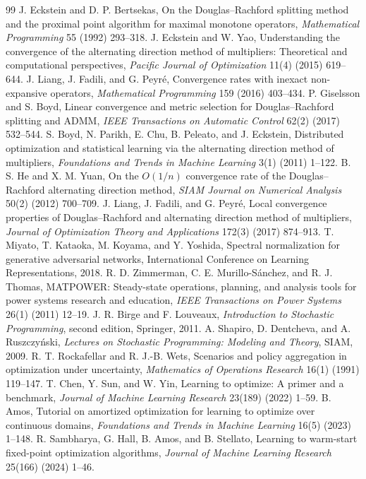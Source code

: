 \documentclass[preprint,12pt,3p]{elsarticle}
\theoremstyle{definition}
\begin{document}
\begin{thebibliography}{99}
J. Eckstein and D. P. Bertsekas, On the Douglas--Rachford splitting method and the proximal point algorithm for maximal monotone operators, \emph{Mathematical Programming} 55 (1992) 293--318.
J. Eckstein and W. Yao, Understanding the convergence of the alternating direction method of multipliers: Theoretical and computational perspectives, \emph{Pacific Journal of Optimization} 11(4) (2015) 619--644.
J. Liang, J. Fadili, and G. Peyr\'e, Convergence rates with inexact non-expansive operators, \emph{Mathematical Programming} 159 (2016) 403--434.
P. Giselsson and S. Boyd, Linear convergence and metric selection for Douglas--Rachford splitting and ADMM, \emph{IEEE Transactions on Automatic Control} 62(2) (2017) 532--544.
S. Boyd, N. Parikh, E. Chu, B. Peleato, and J. Eckstein, Distributed optimization and statistical learning via the alternating direction method of multipliers, \emph{Foundations and Trends in Machine Learning} 3(1) (2011) 1--122.
B. S. He and X. M. Yuan, On the $O(1/n)$ convergence rate of the Douglas--Rachford alternating direction method, \emph{SIAM Journal on Numerical Analysis} 50(2) (2012) 700--709.
J. Liang, J. Fadili, and G. Peyr\'e, Local convergence properties of Douglas--Rachford and alternating direction method of multipliers, \emph{Journal of Optimization Theory and Applications} 172(3) (2017) 874--913.
T. Miyato, T. Kataoka, M. Koyama, and Y. Yoshida, Spectral normalization for generative adversarial networks, International Conference on Learning Representations, 2018.
R. D. Zimmerman, C. E. Murillo-S\'anchez, and R. J. Thomas, MATPOWER: Steady-state operations, planning, and analysis tools for power systems research and education, \emph{IEEE Transactions on Power Systems} 26(1) (2011) 12--19.
J. R. Birge and F. Louveaux, \emph{Introduction to Stochastic Programming}, second edition, Springer, 2011.
A. Shapiro, D. Dentcheva, and A. Ruszczy\'nski, \emph{Lectures on Stochastic Programming: Modeling and Theory}, SIAM, 2009.
R. T. Rockafellar and R. J.-B. Wets, Scenarios and policy aggregation in optimization under uncertainty, \emph{Mathematics of Operations Research} 16(1) (1991) 119--147.
T. Chen, Y. Sun, and W. Yin, Learning to optimize: A primer and a benchmark, \emph{Journal of Machine Learning Research} 23(189) (2022) 1--59.
B. Amos, Tutorial on amortized optimization for learning to optimize over continuous domains, \emph{Foundations and Trends in Machine Learning} 16(5) (2023) 1--148.
R. Sambharya, G. Hall, B. Amos, and B. Stellato, Learning to warm-start fixed-point optimization algorithms, \emph{Journal of Machine Learning Research} 25(166) (2024) 1--46.
\end{thebibliography}
\end{document}
